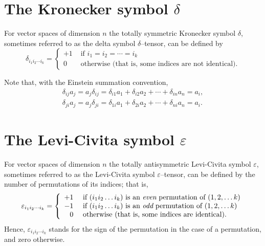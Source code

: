 \section{The Kronecker symbol $\delta$}
For vector spaces of dimension $n$ the totally symmetric Kronecker symbol $\delta$,
sometimes referred to
as the delta symbol $\delta$--tensor, can be defined by
\begin{equation}
\delta_{i_1 i_2\cdots i_k}
=
\left\{
\begin{array}{rl}
+1&\textrm{ if }  i_1 = i_2 = \cdots = i_k \\
0&\textrm{ otherwise (that is, some indices are not identical).}
\end{array}
\right.
\end{equation}

Note that, with the Einstein summation convention,
\begin{equation}
\begin{split}
\delta_{ij} a_j    = a_j  \delta_{ij} =
\delta_{i1} a_1
+
\delta_{i2} a_2
+
\cdots
+
\delta_{in} a_n  =a_i
,  \\
\delta_{ji} a_j = a_j  \delta_{ji} =
\delta_{1i} a_1
+
\delta_{2i} a_2
+
\cdots
+
\delta_{ni} a_n  =a_i
.
\end{split}
\end{equation}

\section{The Levi-Civita symbol $\varepsilon$}
For vector spaces of dimension $n$ the totally antisymmetric Levi-Civita symbol $\varepsilon$, sometimes referred to
as the Levi-Civita symbol $\varepsilon$--tensor, can be defined by the number of permutations of its indices; that is,
\begin{equation}
\varepsilon_{i_1 i_2\cdots i_k}
=
\left\{
\begin{array}{rl}
+1&\textrm{ if } (i_1 i_2\ldots i_k) \textrm{ is an {\em even} permutation of } (1,2,\ldots k)\\
-1&\textrm{ if } (i_1 i_2\ldots i_k) \textrm{ is an {\em odd} permutation of } (1,2,\ldots k)\\
0&\textrm{ otherwise (that is, some indices are identical).}
\end{array}
\right.
\label{2014-m-ch-lcs}
\end{equation}
Hence, $\varepsilon_{i_1 i_2\cdots i_k}$ stands for the sign of the permutation in the case of a permutation, and zero otherwise.

